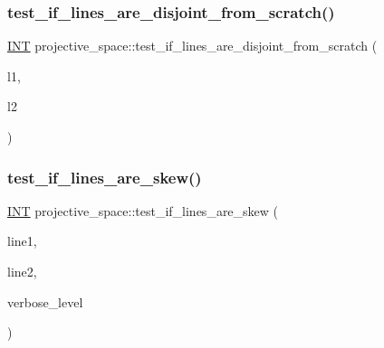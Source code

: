 \mbox{\label{classprojective__space_ae2f9dc4292da2b164992717dfe079632}} 
\subsubsection{\texorpdfstring{test\+\_\+if\+\_\+lines\+\_\+are\+\_\+disjoint\+\_\+from\+\_\+scratch()}{test\_if\_lines\_are\_disjoint\_from\_scratch()}}
{\footnotesize\ttfamily \mbox{\hyperlink{galois_8h_a09fddde158a3a20bd2dcadb609de11dc}{I\+NT}} projective\+\_\+space\+::test\+\_\+if\+\_\+lines\+\_\+are\+\_\+disjoint\+\_\+from\+\_\+scratch (\begin{DoxyParamCaption}\item[{\mbox{\hyperlink{galois_8h_a09fddde158a3a20bd2dcadb609de11dc}{I\+NT}}}]{l1,  }\item[{\mbox{\hyperlink{galois_8h_a09fddde158a3a20bd2dcadb609de11dc}{I\+NT}}}]{l2 }\end{DoxyParamCaption})}

\mbox{\label{classprojective__space_a457f5ec2cc5848dd96f8936d9e33186b}} 
\subsubsection{\texorpdfstring{test\+\_\+if\+\_\+lines\+\_\+are\+\_\+skew()}{test\_if\_lines\_are\_skew()}}
{\footnotesize\ttfamily \mbox{\hyperlink{galois_8h_a09fddde158a3a20bd2dcadb609de11dc}{I\+NT}} projective\+\_\+space\+::test\+\_\+if\+\_\+lines\+\_\+are\+\_\+skew (\begin{DoxyParamCaption}\item[{\mbox{\hyperlink{galois_8h_a09fddde158a3a20bd2dcadb609de11dc}{I\+NT}}}]{line1,  }\item[{\mbox{\hyperlink{galois_8h_a09fddde158a3a20bd2dcadb609de11dc}{I\+NT}}}]{line2,  }\item[{\mbox{\hyperlink{galois_8h_a09fddde158a3a20bd2dcadb609de11dc}{I\+NT}}}]{verbose\+\_\+level }\end{DoxyParamCaption})}

